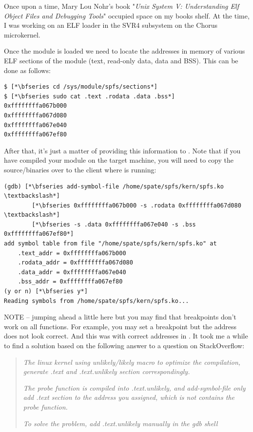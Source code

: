 \noindent
Once upon a time, Mary Lou Nohr's book "\textit{Unix System V: Understanding Elf Object Files and Debugging Tools}" \cite{nohr} occupied space on my books shelf. At the time, I was working on an ELF loader in the SVR4 subsystem on the Chorus microkernel.

Once the module is loaded we need to locate the addresses in memory of various ELF sections of the module (text, read-only data, data and BSS). This can be done as follows:

\begin{lstlisting}
$ [*\bfseries cd /sys/module/spfs/sections*]
$ [*\bfseries sudo cat .text .rodata .data .bss*]
0xffffffffa067b000
0xffffffffa067d080
0xffffffffa067e040
0xffffffffa067ef80
\end{lstlisting}

\noindent
After that, it's just a matter of providing this information to . Note that if you have compiled your module on the target machine, you will need to copy the source/binaries over to the client where  is running:

\begin{lstlisting}
(gdb) [*\bfseries add-symbol-file /home/spate/spfs/kern/spfs.ko \textbackslash*]
        [*\bfseries 0xffffffffa067b000 -s .rodata 0xffffffffa067d080 \textbackslash*]
        [*\bfseries -s .data 0xffffffffa067e040 -s .bss 0xffffffffa067ef80*]
add symbol table from file "/home/spate/spfs/kern/spfs.ko" at
	.text_addr = 0xffffffffa067b000
	.rodata_addr = 0xffffffffa067d080
	.data_addr = 0xffffffffa067e040
	.bss_addr = 0xffffffffa067ef80
(y or n) [*\bfseries y*]
Reading symbols from /home/spate/spfs/kern/spfs.ko...
\end{lstlisting}

\noindent
NOTE -- jumping ahead a little here but you may find that breakpoints don't work on all functions. For example, you may set a breakpoint but the address does not look correct. And this was with correct addresses in . It took me a while to find a solution based on the following answer to a question on StackOverflow:

\begin{quote}
\textit{The linux kernel using unlikely/likely macro to optimize the compilation, generate .text and .text.unlikely section correspondingly.}

\textit{The probe function is compiled into .text.unlikely, and add-symbol-file only add .text section to the address you assigned, which is not contains the probe function.}

\textit{To solve the problem, add .text.unlikely manually in the gdb shell}
\end{quote}

